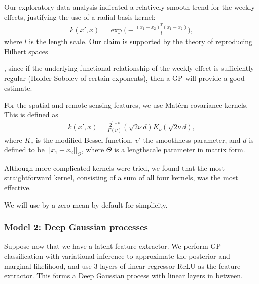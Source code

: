 \documentclass[letterpaper,10pt,english]{sphinxmanual}
\begin{document}
Our exploratory data analysis indicated a relatively smooth trend for the weekly effects, justifying the use of a radial basis kernel:
\begin{equation*}
\begin{split}k(x', x) =  \exp\Bigg(-\frac{(x_1-x_2)^T(x_1-x_2)}{l} \Bigg),\end{split}
\end{equation*}
where \(l\) is the length scale.
Our claim is supported by the theory of reproducing Hilbert spaces %
\begin{footnote}[9]\sphinxAtStartFootnote
{}
%
\end{footnote}, since if the underlying functional relationship of the weekly effect is sufficiently regular (Holder-Sobolev of
certain exponents), then a GP will provide a good estimate.

For the spatial and remote sensing features, we use Matérn covariance kernels. This is defined as
\begin{equation*}
\begin{split}k(x', x) =  \frac{2^{1-\nu}}{\Gamma(\nu)}(\sqrt{2\nu}d)K_\nu(\sqrt{2\nu}d),\end{split}
\end{equation*}
where \(K_\nu\) is the modified Bessel function, \(v'\) the smoothness parameter, and \(d\) is defined to be \(||x_1-x_2||_\Theta\), where \(\Theta\) is a lengthscale parameter in matrix form.

Although more complicated kernels were tried, we found that the most straightforward kernel, consisting of a sum of all four kernels, was the most effective.

We will use by a zero mean by default for simplicity.


\subsubsection{Model 2: Deep Gaussian processes}
\label{\detokenize{models/when:model-2-deep-gaussian-processes}}
Suppose now that we have a latent feature extractor. We perform GP classification with variational inference to approximate the posterior and marginal likelihood, and use 3 layers of linear regressor-ReLU as the feature extractor. This forms a Deep Gaussian process with linear layers in between.
\end{document}
